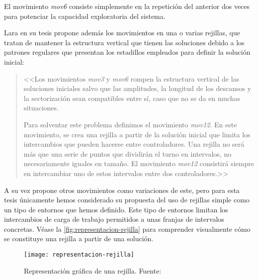 El movimiento \textit{mov6} consiste simplemente en la repetición del anterior dos veces para potenciar la capacidad exploratoria del sistema.

Lara en su tesis propone además los movimientos en una o varias rejillas, que tratan de mantener la estructura vertical que tienen las soluciones debido a los patrones regulares que presentan los estadillos empleados para definir la solución inicial:

\begin{quotation} {\itshape

<<Los movimientos \textit{mov3} y \textit{mov6} rompen la estructura vertical de las soluciones
iniciales salvo que las amplitudes, la longitud de los descansos y la sectorización sean
compatibles entre sí, caso que no se da en muchas situaciones.

Para solventar este problema definimos el movimiento \textit{mov12}. En este movimiento,
se crea una rejilla a partir de la solución inicial que limita los intercambios
que pueden hacerse entre controladores. Una rejilla no será más que una serie de
puntos que dividirán el turno en intervalos, no necesariamente iguales en tamaño. El
movimiento \textit{mov12} consistirá siempre en intercambiar uno de estos intervalos entre
dos controladores.>>}
\end{quotation}

A su vez propone otros movimientos como variaciones de este, pero para esta tesis únicamente hemos considerado su propuesta del uso de rejillas simple como un tipo de entornos que hemos definido. Este tipo de entornos limitan los intercambios de carga de trabajo permitidos a unas franjas de intervalos concretas. Véase la \autoref{fig:representacion-rejilla} para comprender visualmente cómo se constituye una rejilla a partir de una solución.

\begin{figure}
    \centering
    \texttt{[image: representacion-rejilla]}
    \caption[Representación gráfica de una rejilla]{Representación gráfica de una rejilla. Fuente:~\cite{tesis-jonatan}}
    \label{fig:representacion-rejilla}
\end{figure}

